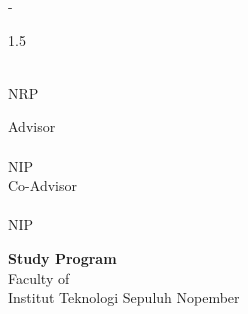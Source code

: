 \begin{large}
  \ifdefined\engcoverdoctypename\engcoverdoctypename\else\engdoctypename\fi{} - \coursecode{}
\end{large}

\vspace{\fill}

\begin{spacing}{1.5}
  \begin{Large}
    \engtatitle{}
  \end{Large}
\end{spacing}

\vspace{\fill}

\begin{large}
  \name{} \\
  \textmd{NRP \nrp{}}
\end{large}

\vspace{\fill}

\begin{large}
  \textmd{Advisor} \\
  \textbf{\advisor{}} \\
  \ifstrequal{\advisornip}{-}{}{\textmd{NIP \advisornip{}}\\}%
  \ifstrequal{\coadvisor}{-}{}{%
    \ifdefined\engcoadvisorrole\textmd{\engcoadvisorrole{}}\else\textmd{Co-Advisor}\fi \\
    \textbf{\coadvisor{}}%
    \ifstrequal{\coadvisornip}{-}{}{\\\textmd{NIP \coadvisornip{}}}%
  }
\end{large}

\vspace{\fill}

\begin{large}
  \textbf{Study Program \engstudyprogram{}} \\
  \textmd{Faculty of \engfaculty{}} \\
  \textmd{Institut Teknologi Sepuluh Nopember} \\
  \textmd{\place{}} \\
  \textmd{\the\year{}}
\end{large}
